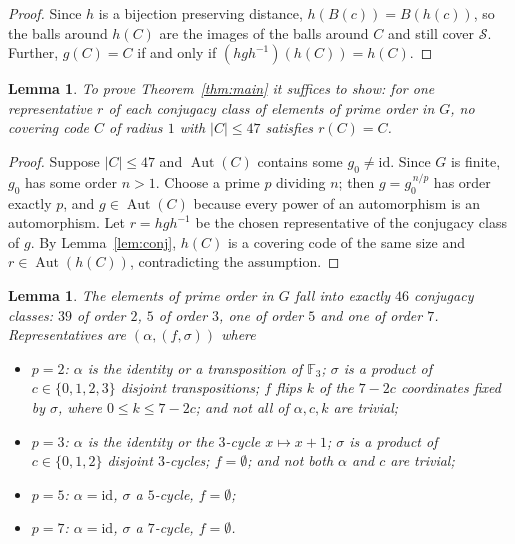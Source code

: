 \documentclass[11pt]{article}
\newtheorem{lemma}[theorem]{Lemma}
\theoremstyle{definition}
\theoremstyle{remark}
\newcommand{\F}{\mathbb{F}}
\newcommand{\Sp}{\mathcal{S}}
\newcommand{\Aut}{\operatorname{Aut}}
\begin{document}
\begin{proof}
Since $h$ is a bijection preserving distance, $h(B(c))=B(h(c))$, so the balls around $h(C)$ are
the images of the balls around $C$ and still cover $\Sp$. Further, $g(C)=C$ if and only if
$(hgh^{-1})(h(C))=h(C)$.
\end{proof}

\begin{lemma}\label{lem:prime}
To prove Theorem~\ref{thm:main} it suffices to show: for one representative $r$ of each
conjugacy class of elements of prime order in $G$, no covering code $C$ of radius $1$ with
$|C|\le 47$ satisfies $r(C)=C$.
\end{lemma}

\begin{proof}
Suppose $|C|\le 47$ and $\Aut(C)$ contains some $g_0\neq\mathrm{id}$. Since $G$ is finite, $g_0$
has some order $n>1$. Choose a prime $p$ dividing $n$; then $g=g_0^{\,n/p}$ has order exactly
$p$, and $g\in\Aut(C)$ because every power of an automorphism is an automorphism.
Let $r=hgh^{-1}$ be the chosen representative
of the conjugacy class of $g$. By Lemma~\ref{lem:conj}, $h(C)$ is a covering code of the same
size and $r\in\Aut(h(C))$, contradicting the assumption.
\end{proof}

\begin{lemma}\label{lem:classes}
The elements of prime order in $G$ fall into exactly $46$ conjugacy classes: $39$ of order $2$,
$5$ of order $3$, one of order $5$ and one of order $7$. Representatives are $(\alpha,(f,\sigma))$
where
\begin{itemize}
\item $p=2$: $\alpha$ is the identity or a transposition of $\F_3$; $\sigma$ is a product of
  $c\in\{0,1,2,3\}$ disjoint transpositions; $f$ flips $k$ of the $7-2c$ coordinates fixed by
  $\sigma$, where $0\le k\le 7-2c$; and not all of $\alpha,c,k$ are trivial;
\item $p=3$: $\alpha$ is the identity or the $3$-cycle $x\mapsto x+1$; $\sigma$ is a product of
  $c\in\{0,1,2\}$ disjoint $3$-cycles; $f=\emptyset$; and not both $\alpha$ and $c$ are trivial;
\item $p=5$: $\alpha=\mathrm{id}$, $\sigma$ a $5$-cycle, $f=\emptyset$;
\item $p=7$: $\alpha=\mathrm{id}$, $\sigma$ a $7$-cycle, $f=\emptyset$.
\end{itemize}
\end{lemma}
\end{document}
